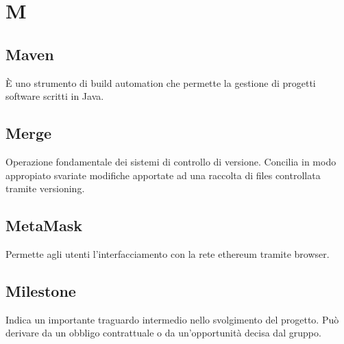 \section*{M}

\subsection{Maven}
È uno strumento di build automation che permette la gestione di progetti software scritti in Java.

\subsection{Merge} 
Operazione fondamentale dei sistemi di controllo di versione. Concilia in modo appropiato svariate modifiche apportate ad una raccolta di files controllata tramite versioning.

\subsection{MetaMask}
Permette agli utenti l'interfacciamento con la rete ethereum tramite browser.

\subsection{Milestone} 
Indica un importante traguardo intermedio nello svolgimento del progetto. Può derivare da un obbligo contrattuale o da un'opportunità decisa dal gruppo.
